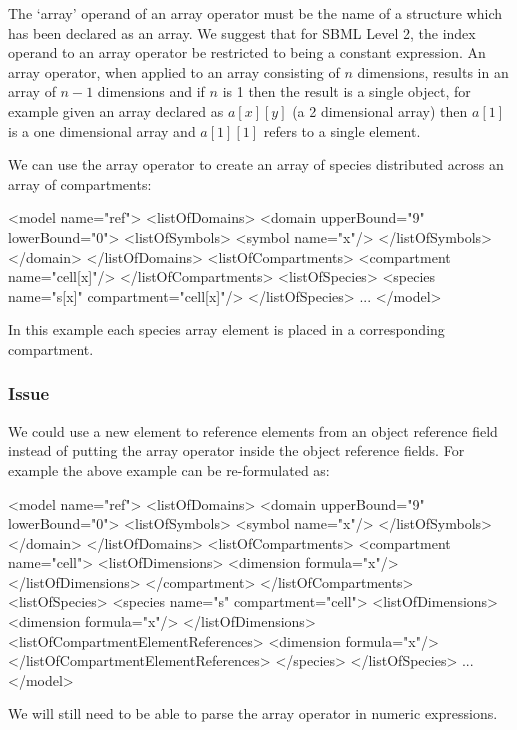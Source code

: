 \documentclass{cekarticle}
\begin{document}
The `array' operand of an array operator must be the name of a
structure which has been declared as an array. We suggest that
for SBML Level 2, the index operand to an array operator be
restricted to being a constant expression.  An array operator,
when applied to an array consisting of $n$ dimensions, results in
an array of $n-1$ dimensions and if $n$ is 1 then the result is a
single object, for example given an array declared as $a[x][y]$
(a 2 dimensional array) then $a[1]$ is a one dimensional array
and $a[1][1]$ refers to a single element.

We can use the array operator to create an array of species
distributed across an array of compartments:
\begin{example}
<model name="ref">
    <listOfDomains>
        <domain upperBound="9" lowerBound="0">
            <listOfSymbols>
                <symbol name="x"/>
            </listOfSymbols>
        </domain>
    </listOfDomains>
    <listOfCompartments>
        <compartment name="cell[x]"/>
    </listOfCompartments>
    <listOfSpecies>
        <species name="s[x]" compartment="cell[x]"/>
    </listOfSpecies>
    ...
</model>
\end{example}
In this example each species array element is placed in a
corresponding compartment.

\subsubsection{Issue}
We could use a new element to reference elements from an object
reference field instead of putting the array operator inside the
object reference fields. For example the above example can be
re-formulated as:
\begin{example}
<model name="ref">
    <listOfDomains>
        <domain upperBound="9" lowerBound="0">
            <listOfSymbols>
                <symbol name="x"/>
            </listOfSymbols>
        </domain>
    </listOfDomains>
    <listOfCompartments>
        <compartment name="cell">
            <listOfDimensions>
                <dimension formula="x"/>
            </listOfDimensions>
        </compartment>
    </listOfCompartments>
    <listOfSpecies>
        <species name="s" compartment="cell">
            <listOfDimensions>
                <dimension formula="x"/>
            </listOfDimensions>
            <listOfCompartmentElementReferences>
                <dimension formula="x"/>
            </listOfCompartmentElementReferences>
        </species>
    </listOfSpecies>
    ...
</model>

\end{example}
We will still need to be able to parse the array operator in
numeric expressions.
\end{document}
